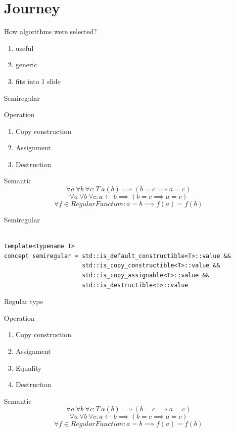 \documentclass[10pt]{beamer}
\begin{document}
\section{Journey}
\begin{frame}{How algorithms were selected?}
  \begin{enumerate}
    \item useful
    \item generic
    \item fits into 1 slide
  \end{enumerate}
\end{frame}


\begin{frame}{Semiregular}
    \begin{block}{Operation}
      \begin{enumerate}
        \item Copy construction
        \item Assignment
        \item Destruction
      \end{enumerate}
    \end{block}

    \begin{block}{Semantic}
        $$\forall a ~ \forall b ~ \forall c : T~a(b)  \implies(b = c \implies a = c)$$
        $$\forall a ~ \forall b ~ \forall c : a \leftarrow b  \implies(b = c \implies a = c)$$
        $$\forall f \in RegularFunction: a = b \implies f(a) = f(b)$$
    \end{block}
\end{frame}

\begin{frame}[fragile]{Semiregular}
\begin{lstlisting}[style=cpp]

template<typename T>
concept semiregular = std::is_default_constructible<T>::value &&
                      std::is_copy_constructible<T>::value &&
                      std::is_copy_assignable<T>::value &&
                      std::is_destructible<T>::value

\end{lstlisting}
\end{frame}

\begin{frame}{Regular type}
\begin{block}{Operation}
  \begin{enumerate}
    \item Copy construction
    \item Assignment
    \item Equality
    \item Destruction
  \end{enumerate}
\end{block}
\begin{block}{Semantic}
    $$\forall a ~ \forall b ~ \forall c : T~a(b)  \implies(b = c \implies a = c)$$
    $$\forall a ~ \forall b ~ \forall c : a \leftarrow b  \implies(b = c \implies a = c)$$
    $$\forall f \in RegularFunction: a = b \implies f(a) = f(b)$$
\end{block}
\end{frame}
\end{document}
